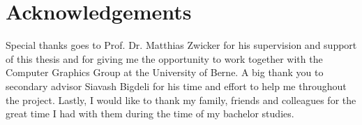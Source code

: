 \chapter*{Acknowledgements}

Special thanks goes to Prof. Dr. Matthias Zwicker for his supervision and support of this thesis and for giving me the opportunity to work together with the Computer Graphics Group at the University of Berne.
A big thank you to secondary advisor Siavash Bigdeli for his time and effort to help me throughout the project.
Lastly, I would like to thank my family, friends and colleagues for the great time I had with them during the time of my bachelor studies.
